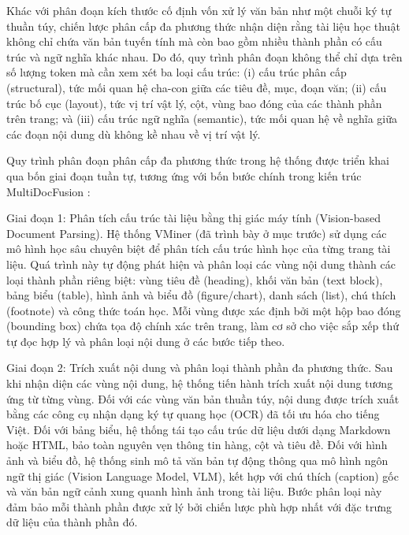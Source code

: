 \indent Khác với phân đoạn kích thước cố định vốn xử lý văn bản như một chuỗi ký tự thuần túy, chiến lược phân cấp đa phương thức nhận diện rằng tài liệu học thuật không chỉ chứa văn bản tuyến tính mà còn bao gồm nhiều thành phần có cấu trúc và ngữ nghĩa khác nhau. Do đó, quy trình phân đoạn không thể chỉ dựa trên số lượng token mà cần xem xét ba loại cấu trúc: (i) cấu trúc phân cấp (structural), tức mối quan hệ cha-con giữa các tiêu đề, mục, đoạn văn; (ii) cấu trúc bố cục (layout), tức vị trí vật lý, cột, vùng bao đóng của các thành phần trên trang; và (iii) cấu trúc ngữ nghĩa (semantic), tức mối quan hệ về nghĩa giữa các đoạn nội dung dù không kề nhau về vị trí vật lý.

\indent Quy trình phân đoạn phân cấp đa phương thức trong hệ thống được triển khai qua bốn giai đoạn tuần tự, tương ứng với bốn bước chính trong kiến trúc MultiDocFusion \cite{shin-etal-2025-multidocfusion}:

\indent Giai đoạn 1: Phân tích cấu trúc tài liệu bằng thị giác máy tính (Vision-based Document Parsing). Hệ thống VMiner (đã trình bày ở mục trước) sử dụng các mô hình học sâu chuyên biệt để phân tích cấu trúc hình học của từng trang tài liệu. Quá trình này tự động phát hiện và phân loại các vùng nội dung thành các loại thành phần riêng biệt: vùng tiêu đề (heading), khối văn bản (text block), bảng biểu (table), hình ảnh và biểu đồ (figure/chart), danh sách (list), chú thích (footnote) và công thức toán học. Mỗi vùng được xác định bởi một hộp bao đóng (bounding box) chứa tọa độ chính xác trên trang, làm cơ sở cho việc sắp xếp thứ tự đọc hợp lý và phân loại nội dung ở các bước tiếp theo.

\indent Giai đoạn 2: Trích xuất nội dung và phân loại thành phần đa phương thức. Sau khi nhận diện các vùng nội dung, hệ thống tiến hành trích xuất nội dung tương ứng từ từng vùng. Đối với các vùng văn bản thuần túy, nội dung được trích xuất bằng các công cụ nhận dạng ký tự quang học (OCR) đã tối ưu hóa cho tiếng Việt. Đối với bảng biểu, hệ thống tái tạo cấu trúc dữ liệu dưới dạng Markdown hoặc HTML, bảo toàn nguyên vẹn thông tin hàng, cột và tiêu đề. Đối với hình ảnh và biểu đồ, hệ thống sinh mô tả văn bản tự động thông qua mô hình ngôn ngữ thị giác (Vision Language Model, VLM), kết hợp với chú thích (caption) gốc và văn bản ngữ cảnh xung quanh hình ảnh trong tài liệu. Bước phân loại này đảm bảo mỗi thành phần được xử lý bởi chiến lược phù hợp nhất với đặc trưng dữ liệu của thành phần đó.

